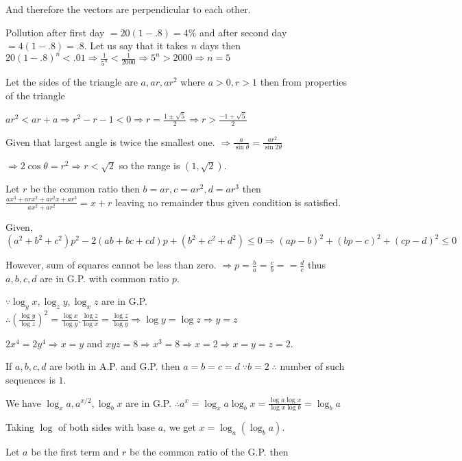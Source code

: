   And therefore the vectors are perpendicular to each other.
\item Pollution after first day $= 20(1 - .8) = 4\%$ and after second day $= 4(1 - .8) = .8$. Let us say
  that it takes $n$ days then $20(1 - .8)^n < .01 \Rightarrow \frac{1}{5^n} < \frac{1}{2000} \Rightarrow 5^n
  > 2000 \Rightarrow n = 5$
\item Let the sides of the triangle are $a, ar, ar^2$ where $a > 0, r > 1$ then from properties of the triangle

  $ar^2 < ar + a \Rightarrow r^2 - r - 1 < 0 \Rightarrow r = \frac{1 \pm \sqrt{5}}{2} \Rightarrow r >
  \frac{-1 + \sqrt{5}}{2}$

  Given that largest angle is twice the smallest one. $\Rightarrow \frac{a}{\sin\theta} =
  \frac{ar^2}{\sin2\theta}$

  $\Rightarrow 2\cos\theta = r^2\Rightarrow r < \sqrt{2}$ so the range is $(1, \sqrt{2})$.
\item Let $r$ be the common ratio then $b = ar, c = ar^2 , d = ar^3$ then $\frac{ax^3 + arx^2 + ar^2x +
  ar^3}{ax^2 + ar^2} = x + r$ leaving no remainder thus given condition is satisfied.
\item Given, $(a^2 + b^2 + c^2)p^2 - 2(ab + bc + cd)p + (b^2 + c^2 + d^2)\leq 0 \Rightarrow (ap - b)^2 + (bp -
  c)^2 + (cp - d)^2\leq 0$

  However, sum of squares cannot be less than zero. $\Rightarrow p = \frac{b}{a} = \frac{c}{b} =
  =\frac{d}{c}$ thus $a, b, c, d$ are in G.P. with common ratio $p$.
\item $\because \log_yx, \log_zy, \log_xz$ are in G.P. $\therefore \left(\frac{\log y}{\log z}\right)^2 =
  \frac{\log x}{\log y}.\frac{\log z}{\log x} = \frac{\log z}{\log y} \Rightarrow \log y = \log z
  \Rightarrow y = z$

  $2x^4 = 2y^4 \Rightarrow x = y$ and $xyz = 8 \Rightarrow x^3 = 8 \Rightarrow x = 2 \Rightarrow x = y = z =
  2$.
\item If $a, b, c, d$ are both in A.P. and G.P. then $a = b = c = d\;\because b = 2\;\therefore$ number of
  such sequences is $1$.
\item We have $\log_x a, a^{x/2}, \log_b x$ are in G.P. $\therefore a^x = \log_xa \log_bx = \frac{\log a\log
  x}{\log x\log b} = \log_ba$

  Taking $\log$ of both sides with base $a$, we get $x = \log_a(\log_b a)$.
\item Let $a$ be the first term and $r$ be the common ratio of the G.P. then

